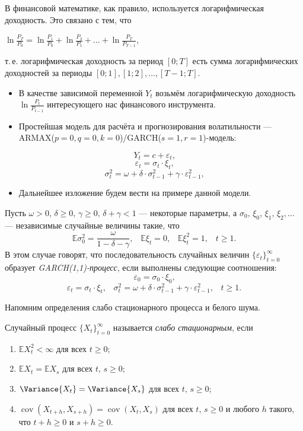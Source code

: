 В финансовой математике, как правило, используется логарифмическая доходность. Это связано с тем, что
\begin{center}
    $\ln\frac{P_T}{P_0} = \ln\frac{P_1}{P_0} + \ln\frac{P_2}{P_1} + ... + \ln\frac{P_{T}}{P_{T-1}}$,
\end{center}
т.\,е. логарифмическая доходность за период $[0;T]$ есть сумма логарифмических доходностей за периоды ${[0;1], [1;2], \ldots, [T-1;T]}$.
\begin{itemize}
  \item В качестве зависимой переменной $Y_t$ возьмём логарифмическую доходность $\ln\frac{P_t}{P_{t-1}}$ интересующего нас финансового инструмента.
  \item Простейшая модель для расчёта и прогнозирования волатильности --- ARMAX($p=0, q=0, k=0$)/GARCH($s=1, r=1$)-модель:
\end{itemize}
\[
    Y_t = c + \varepsilon_t \text{,}
\]
\[
    \varepsilon_t = \sigma_t\cdot\xi_t \text{,}
\]
\[
    \sigma_t^2 = \omega + \delta\cdot\sigma_{t-1}^2 + \gamma\cdot\varepsilon_{t-1}^2 \text{,}
\]
\begin{itemize}
  \item Дальнейшее изложение будем вести на примере данной модели.
\end{itemize}
\begin{Definition}
Пусть $\omega > 0, \, \delta \geq 0, \, \gamma \geq 0, \, \delta + \gamma < 1$ --- некоторые параметры, а $\sigma_0, \, \xi_0, \, \xi_1, \, \xi_2, \ldots$ --- независимые случайные величины такие, что
\[
    \mathbb{E}\sigma_{0}^{2}=\frac{\omega }{1-\delta -\gamma} \text{,} \quad \mathbb{E}\xi_t = 0 \text{,} \quad \mathbb{E}\xi_t^2 = 1 \text{,} \quad t \geq 1 \text{.}
\]
В этом случае говорят, что последовательность случайных величин $\{\varepsilon_t\}_{t=0}^{\infty}$ образует \textit{GARCH(1,1)-процесс}, если выполнены следующие соотношения:
\[
    \varepsilon_0 = \sigma_0 \cdot \xi_0 \text{,}
\]
\[
    \varepsilon_t = \sigma_t \cdot \xi_t \text{,} \quad \sigma_t^2 = \omega + \delta \cdot \sigma_{t-1}^2 + \gamma \cdot \varepsilon_{t-1}^2 \text{,} \quad t \geq 1 \text{.}
\]
\end{Definition}

Напомним определения слабо стационарного процесса и белого шума.
\begin{Definition}
Случайный процесс $\{X_t\}_{t=0}^\infty$ называется \textit{слабо стационарным}, если
    \begin{enumerate}
      \item $\mathbb{E}{X_t^2} < \infty$ для всех $t \geq 0$;
      \item $\mathbb{E}{X_t} = \mathbb{E}{X_s}$ для всех $t,\, s \geq 0$;
      \item $\Variance{X_t} = \Variance{X_s}$ для всех $t,\, s \geq 0$;
      \item $\operatorname{cov}(X_{t+h},X_{s+h}) = \operatorname{cov}(X_{t},X_{s})$ для всех $t,\,s \geq 0$ и любого $h$ такого, что $t+h \geq 0$ и $s+h \geq 0$.
    \end{enumerate}
\end{Definition}

